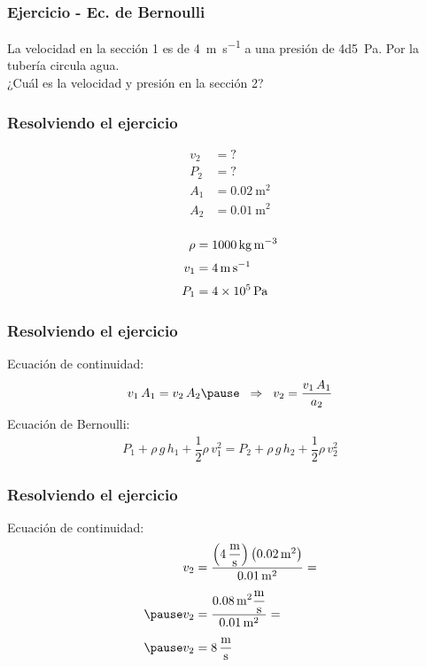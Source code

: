 \documentclass[14pt]{beamer}
\begin{document}
\begin{frame}
\frametitle{Ejercicio - Ec. de Bernoulli}
La velocidad en la sección 1 es de \SI[per-mode=symbol]{4}{\meter\per\second} a una presión de \SI{4d5}{\pascal}. Por la tubería circula agua.
\\
\bigskip
\pause
¿Cuál es la velocidad y presión en la sección 2?
\end{frame}
\begin{frame}
\frametitle{Resolviendo el ejercicio}
\vspace*{-1cm}
\begin{minipage}[t]{0.4\linewidth}
\begin{align*}
v_{2} &= ? \\[0.25em]
P_{2} &= ? \\[0.25em]
A_{1} &= \SI{0.02}{\square\meter} \\[0.25em]
A_{2} &= \SI{0.01}{\square\meter} \\[0.25em]
\end{align*}
\end{minipage}
\begin{minipage}[t]{0.4\linewidth}
\begin{align*}
\rho &= \SI{1000}{\kilo\gram\per\cubic\meter} \\[0.25em]
v_{1} &= \SI{4}{\meter\per\second} \\[0.25em]
P_{1} &= \SI{4d5}{\pascal}
\end{align*}
\end{minipage}
\end{frame}
\begin{frame}
\frametitle{Resolviendo el ejercicio}
 Ecuación de continuidad:
\pause
\begin{eqnarray*}
\begin{aligned}
v_{1} \, A_{1} = v_{2} \, A_{2} \pause \hspace*{0.2cm} \Rightarrow \hspace*{0.2cm} v_{2} = \dfrac{v_{1} \, A_{1}}{a_{2}}
\end{aligned}
\end{eqnarray*}
\pause
Ecuación de Bernoulli:
\pause
\begin{align*}
P_{1} + \rho \, g \, h_{1} + \dfrac{1}{2} \rho \, v_{1}^{2} = P_{2} + \rho \, g \, h_{2} + \dfrac{1}{2} \rho \, v_{2}^{2}
\end{align*}
\end{frame}
\begin{frame}
\frametitle{Resolviendo el ejercicio}
 Ecuación de continuidad:
\pause
\begin{eqnarray*}
\begin{aligned}
v_{2} &= \dfrac{\left( \displaystyle \SI[per-mode=fraction]{4}{\meter\per\second}\right) \left( \SI{0.02}{\square\meter}\right)}{\SI{0.01}{\square\meter}} = \\[0.5em] \pause
v_{2} &= \dfrac{ \displaystyle \SI{0.08}{\square\meter} \si[per-mode=fraction]{\meter\per\second}}{\SI{0.01}{\square\meter}} =  \\[0.5em] \pause
v_{2} &= \SI[per-mode=fraction]{8}{\meter\per\second}
\end{aligned}
\end{eqnarray*}
\end{frame}
\end{document}
